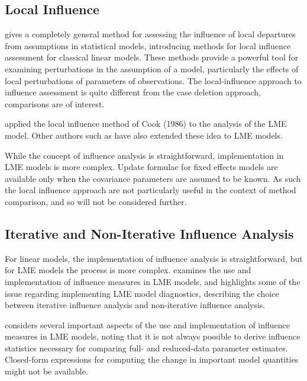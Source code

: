 \documentclass[12pt, a4paper]{report}
\theoremstyle{definition}
\theoremstyle{remark}
\begin{document}
\subsection{Local Influence}
\citet{cook86} gives a completely general method for assessing the influence of local departures from assumptions in statistical models, introducing methods for local influence assessment for classical linear models. These methods provide a powerful tool for examining perturbations in the assumption of a model, particularly the effects of local perturbations of parameters of observations. The local-influence approach to influence assessment is quite different from the case deletion approach, comparisons are of interest.

\citet{Beckman} applied the local influence method of Cook (1986) to the analysis of the LME model.  Other authors such as \citet{lesaffre1998local} have also extended these idea to LME models. 


While the concept of influence analysis is straightforward, implementation in LME models is more complex. Update formulae for fixed effects models are available only when the covariance parameters are assumed to be known. As such the local influence approach are not particularly useful in the context of method comparison, and so will not be considered further.






\subsection{Iterative and Non-Iterative Influence Analysis}

For linear models, the implementation of influence analysis is straightforward, but for LME models the process is more complex. \citet{schabenberger} examines the use and implementation of influence measures in LME models, and highlights some of the issue regarding implementing LME model diagnostics, describing the choice between  iterative influence analysis and  non-iterative influence analysis.

\citet{schabenberger} considers several important aspects of the use and implementation of influence measures in LME models, noting that it is not always possible to derive influence statistics necessary for comparing full- and reduced-data parameter estimates. Closed-form expressions for computing the change in important model quantities might not be available.
\end{document}

